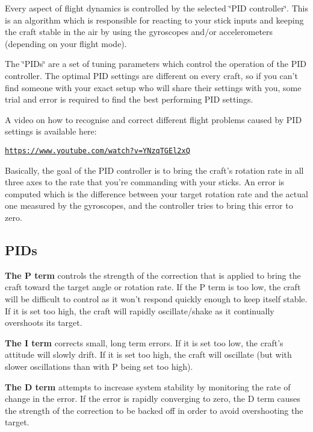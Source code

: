 Every aspect of flight dynamics is controlled by the selected \char`\"{}\+P\+I\+D controller\char`\"{}. This is an algorithm which is responsible for reacting to your stick inputs and keeping the craft stable in the air by using the gyroscopes and/or accelerometers (depending on your flight mode).

The \char`\"{}\+P\+I\+Ds\char`\"{} are a set of tuning parameters which control the operation of the P\+I\+D controller. The optimal P\+I\+D settings are different on every craft, so if you can't find someone with your exact setup who will share their settings with you, some trial and error is required to find the best performing P\+I\+D settings.

A video on how to recognise and correct different flight problems caused by P\+I\+D settings is available here\+:

\href{https://www.youtube.com/watch?v=YNzqTGEl2xQ}{\tt https\+://www.\+youtube.\+com/watch?v=\+Y\+Nzq\+T\+G\+El2x\+Q}

Basically, the goal of the P\+I\+D controller is to bring the craft's rotation rate in all three axes to the rate that you're commanding with your sticks. An error is computed which is the difference between your target rotation rate and the actual one measured by the gyroscopes, and the controller tries to bring this error to zero.

\subsection*{P\+I\+Ds}

{\bfseries The P term} controls the strength of the correction that is applied to bring the craft toward the target angle or rotation rate. If the P term is too low, the craft will be difficult to control as it won't respond quickly enough to keep itself stable. If it is set too high, the craft will rapidly oscillate/shake as it continually overshoots its target.

{\bfseries The I term} corrects small, long term errors. If it is set too low, the craft's attitude will slowly drift. If it is set too high, the craft will oscillate (but with slower oscillations than with P being set too high).

{\bfseries The D term} attempts to increase system stability by monitoring the rate of change in the error. If the error is rapidly converging to zero, the D term causes the strength of the correction to be backed off in order to avoid overshooting the target.

